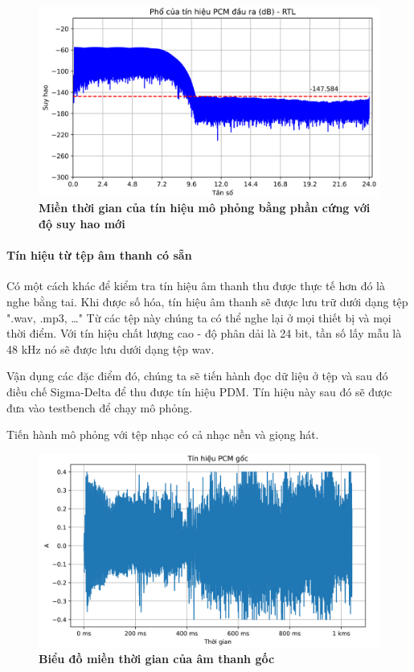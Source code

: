 \begin{figure}[H]
    \centering
    \includegraphics[width=12cm]{Images/Chuong4/tb/sim/sin_2_psd_h.png}
    \caption[Miền thời gian của tín hiệu mô phỏng bằng phần cứng với độ suy hao mới]{\bfseries \fontsize{12pt}{0pt}\selectfont Miền thời gian của tín hiệu mô phỏng bằng phần cứng với độ suy hao mới}
    \label{sin_2_psd_h}
\end{figure}

\paragraph{Tín hiệu từ tệp âm thanh có sẵn}

Có một cách khác để kiểm tra tín hiệu âm thanh thu được thực tế hơn đó là nghe bằng tai. Khi được số hóa, tín hiệu âm thanh sẽ được lưu trữ dưới dạng tệp ".wav, .mp3, \ldots" Từ các tệp này chúng ta có thể nghe lại ở mọi thiết bị và mọi thời điểm. Với tín hiệu chất lượng cao - độ phân dải là 24 bit, tần số lấy mẫu là 48 kHz nó sẽ được lưu dưới dạng tệp wav.

Vận dụng các đặc điểm đó, chúng ta sẽ tiến hành đọc dữ liệu ở tệp và sau đó điều chế Sigma-Delta để thu được tín hiệu PDM. Tín hiệu này sau đó sẽ được đưa vào testbench để chạy mô phỏng.

Tiến hành mô phỏng với tệp nhạc có cả nhạc nền và giọng hát.

\begin{figure}[H]
    \centering
    \includegraphics[width=14cm]{Images/Chuong4/tb/wav/vldd2_2.png}
    \caption[Biểu đồ miền thời gian của âm thanh gốc]{\bfseries \fontsize{12pt}{0pt}\selectfont Biểu đồ miền thời gian của âm thanh gốc}
    \label{vldd2_2}
\end{figure}

